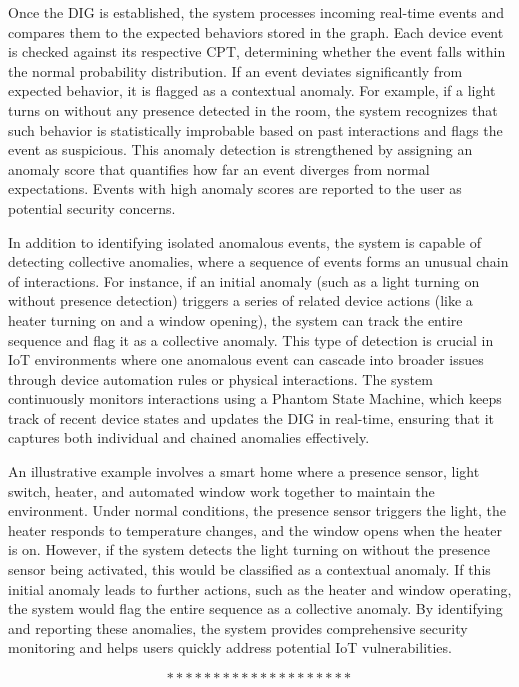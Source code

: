 Once the DIG is established, the system processes incoming real-time events and compares them to the expected behaviors stored in the graph. Each device event is checked against its respective CPT, determining whether the event falls within the normal probability distribution. If an event deviates significantly from expected behavior, it is flagged as a contextual anomaly. For example, if a light turns on without any presence detected in the room, the system recognizes that such behavior is statistically improbable based on past interactions and flags the event as suspicious. This anomaly detection is strengthened by assigning an anomaly score that quantifies how far an event diverges from normal expectations. Events with high anomaly scores are reported to the user as potential security concerns.

In addition to identifying isolated anomalous events, the system is capable of detecting collective anomalies, where a sequence of events forms an unusual chain of interactions. For instance, if an initial anomaly (such as a light turning on without presence detection) triggers a series of related device actions (like a heater turning on and a window opening), the system can track the entire sequence and flag it as a collective anomaly. This type of detection is crucial in IoT environments where one anomalous event can cascade into broader issues through device automation rules or physical interactions. The system continuously monitors interactions using a Phantom State Machine, which keeps track of recent device states and updates the DIG in real-time, ensuring that it captures both individual and chained anomalies effectively.

An illustrative example involves a smart home where a presence sensor, light switch, heater, and automated window work together to maintain the environment. Under normal conditions, the presence sensor triggers the light, the heater responds to temperature changes, and the window opens when the heater is on. However, if the system detects the light turning on without the presence sensor being activated, this would be classified as a contextual anomaly. If this initial anomaly leads to further actions, such as the heater and window operating, the system would flag the entire sequence as a collective anomaly. By identifying and reporting these anomalies, the system provides comprehensive security monitoring and helps users quickly address potential IoT vulnerabilities\cite{74}.

$$********************$$


